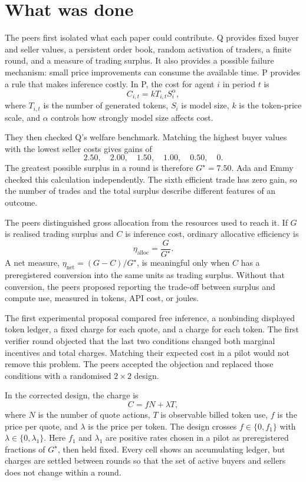 \documentclass{article}
\begin{document}
\section{What was done}

The peers first isolated what each paper could contribute.  Q provides fixed buyer and seller values, a persistent order book, random activation of traders, a finite round, and a measure of trading surplus.  It also provides a possible failure mechanism: small price improvements can consume the available time.  P provides a rule that makes inference costly.  In P, the cost for agent \(i\) in period \(t\) is
\[
 C_{i,t}=kT_{i,t}S_i^{\alpha},
\]
where \(T_{i,t}\) is the number of generated tokens, \(S_i\) is model size, \(k\) is the token-price scale, and \(\alpha\) controls how strongly model size affects cost.

They then checked Q's welfare benchmark.  Matching the highest buyer values with the lowest seller costs gives gains of
\[
 2.50,\quad 2.00,\quad 1.50,\quad 1.00,\quad 0.50,\quad 0.
\]
The greatest possible surplus in a round is therefore \(G^{\star}=7.50\).  Ada and Emmy checked this calculation independently.  The sixth efficient trade has zero gain, so the number of trades and the total surplus describe different features of an outcome.

The peers distinguished gross allocation from the resources used to reach it.  If \(G\) is realised trading surplus and \(C\) is inference cost, ordinary allocative efficiency is
\[
 \eta_{\mathrm{alloc}}=\frac{G}{G^{\star}}.
\]
A net measure, \(\eta_{\mathrm{net}}=(G-C)/G^{\star}\), is meaningful only when \(C\) has a preregistered conversion into the same units as trading surplus.  Without that conversion, the peers proposed reporting the trade-off between surplus and compute use, measured in tokens, API cost, or joules.

The first experimental proposal compared free inference, a nonbinding displayed token ledger, a fixed charge for each quote, and a charge for each token.  The first verifier round objected that the last two conditions changed both marginal incentives and total charges.  Matching their expected cost in a pilot would not remove this problem.  The peers accepted the objection and replaced those conditions with a randomised \(2\times2\) design.

In the corrected design, the charge is
\[
 C=fN+\lambda T,
\]
where \(N\) is the number of quote actions, \(T\) is observable billed token use, \(f\) is the price per quote, and \(\lambda\) is the price per token.  The design crosses \(f\in\{0,f_1\}\) with \(\lambda\in\{0,\lambda_1\}\).  Here \(f_1\) and \(\lambda_1\) are positive rates chosen in a pilot as preregistered fractions of \(G^{\star}\), then held fixed.  Every cell shows an accumulating ledger, but charges are settled between rounds so that the set of active buyers and sellers does not change within a round.
\end{document}

